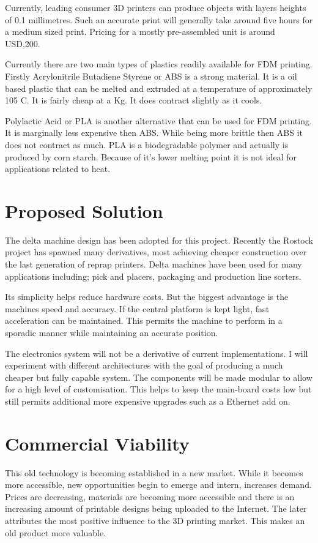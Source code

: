 \documentclass[a4paper, 11pt, twoside]{Thesis}  %
\begin{document}
Currently, leading consumer 3D printers can produce objects with layers heights of 0.1 millimetres. Such an accurate print will generally take around five hours for a medium sized print. Pricing for a mostly pre-assembled unit is around USD,200.

Currently there are two main types of plastics readily available for FDM printing. Firstly Acrylonitrile Butadiene Styrene or ABS is a strong material. It is a oil based plastic that can be melted and extruded at a temperature of approximately 105 \textdegree C. It is fairly cheap at  a Kg. It does contract slightly as it cools.

Polylactic Acid or PLA is another alternative that can be used for FDM printing. It is marginally less expensive then ABS. While being more brittle then ABS it does not contract as much. PLA is a biodegradable polymer and actually is produced by corn starch. Because of it's lower melting point it is not ideal for applications related to heat.
\section{Proposed Solution}

The delta machine design has been adopted for this project. Recently the Rostock project has spawned many derivatives, most achieving cheaper construction over the last generation of reprap printers. Delta machines have been used for many applications including; pick and placers, packaging and production line sorters.

Its simplicity helps reduce hardware costs. But the biggest advantage is the machines speed and accuracy. If the central platform is kept light, fast acceleration can be maintained. This permits the machine to perform in a sporadic manner while maintaining an accurate position.

The electronics system will not be a derivative of current implementations. I will experiment with different architectures with the goal of producing a much cheaper but fully capable system. The components will be made modular to allow for a high level of customisation. This helps to keep the main-board costs low but still permits additional more expensive upgrades such as a Ethernet add on.
\section{Commercial Viability}

This old technology is becoming established in a new market. While it becomes more accessible, new opportunities begin to emerge and intern, increases demand. Prices are decreasing, materials are becoming more accessible and there is an increasing amount of printable designs being uploaded to the Internet. The later attributes the most positive influence to the 3D printing market. This makes an old product more valuable.
\end{document}
